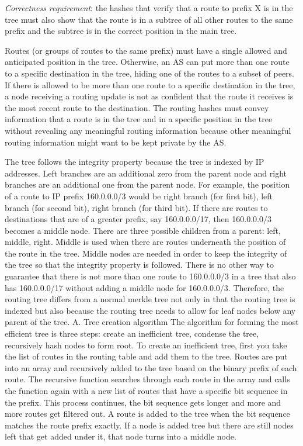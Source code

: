 \documentclass[letterpaper, 10 pt, conference]{ieeeconf}  %
\begin{document}
\textit{Correctness requirement}: the hashes that verify that a route to prefix X is in the tree must also show that the route is in a subtree of all other routes to the same prefix and the subtree is in the correct position in the main tree. 

Routes (or groups of routes to the same prefix) must have a single allowed and anticipated position in the tree. Otherwise, an AS can put more than one route to a specific destination in the tree, hiding one of the routes to a subset of peers. If there is allowed to be more than one route to a specific destination in the tree, a node receiving a routing update is not as confident that the route it receives is the most recent route to the destination. The routing hashes must convey information that a route is in the tree and in a specific position in the tree without revealing any meaningful routing information because other meaningful routing information might want to be kept private by the AS. 

The tree follows the integrity property because the tree is indexed by IP addresses. Left branches are an additional zero from the parent node and right branches are an additional one from the parent node. For example, the position of a route to IP prefix 160.0.0.0/3 would be right branch (for first bit), left branch (for second bit), right branch (for third bit). If there are routes to destinations that are of a greater prefix, say 160.0.0.0/17, then 160.0.0.0/3 becomes a middle node. There are three possible children from a parent: left, middle, right. Middle is used when there are routes underneath the position of the route in the tree. Middle nodes are needed in order to keep the integrity of the tree so that the integrity property is followed. There is no other way to guarantee that there is not more than one route to 160.0.0.0/3 in a tree that also has 160.0.0.0/17 without adding a middle node for 160.0.0.0/3. Therefore, the routing tree differs from a normal merkle tree not only in that the routing tree is indexed but also because the routing tree needs to allow for leaf nodes below any parent of the tree. A. Tree creation algorithm The algorithm for forming the most efficient tree is three steps: create an inefficient tree, condense the tree, recursively hash nodes to form root. To create an inefficient tree, first you take the list of routes in the routing table and add them to the tree. Routes are put into an array and recursively added to the tree based on the binary prefix of each route. The recursive function searches through each route in the array and calls the function again with a new list of routes that have a specific bit sequence in the prefix. This process continues, the bit sequence gets longer and more and more routes get filtered out. A route is added to the tree when the bit sequence matches the route prefix exactly. If a node is added tree but there are still nodes left that get added under it, that node turns into a middle node. 
\end{document}
